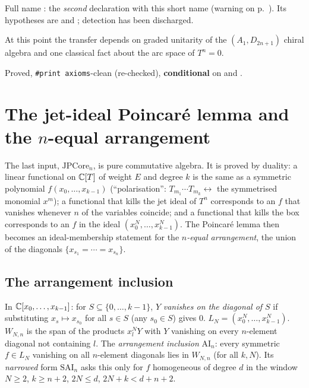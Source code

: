 \begin{dictionary}
Full name : the \emph{second} declaration with this short
name (warning on p.~\pageref{l29:warn:clash}). Its hypotheses are  and ; detection has been discharged.
\end{dictionary}

\begin{physics}
At this point the transfer depends on graded unitarity of the $(A_1,D_{2n+1})$ chiral algebra and one classical fact
about the arc space of $T^n=0$.
\end{physics}

\begin{status}
Proved, \texttt{\#print axioms}-clean (re-checked), \textbf{conditional} on  and .
\end{status}

\section{The jet-ideal Poincar\'e lemma and the \texorpdfstring{$n$}{n}-equal arrangement}\label{l29:sec:arr}

The last input, $\mathrm{JPCore}_n$, is pure commutative algebra. It is proved by duality: a linear functional on
${\mathbb{C}}[T]$ of weight $E$ and degree $k$ is the same as a symmetric polynomial $f(x_0,\dots,x_{k-1})$ (``polarisation'':
$T_{m_1}\cdots T_{m_k}\leftrightarrow$ the symmetrised monomial $x^{m}$); a functional that kills the jet ideal of
$T^n$ corresponds to an $f$ that vanishes whenever $n$ of the variables coincide; and a functional that kills the box
corresponds to an $f$ in the ideal $(x_0^N,\dots,x_{k-1}^N)$. The Poincar\'e lemma then becomes an ideal-membership
statement for the \emph{$n$-equal arrangement}, the union of the diagonals $\{x_{s_1}=\cdots=x_{s_n}\}$.

\subsection{The arrangement inclusion}

\begin{definition}\label{l29:def:arrangement}
In ${\mathbb{C}}[x_0,\dots,x_{k-1}]$: for $S\subseteq\{0,\dots,k-1\}$, $Y$ \emph{vanishes on the diagonal of $S$} if substituting
$x_s\mapsto x_{s_0}$ for all $s\in S$ (any $s_0\in S$) gives $0$. $L_N=(x_0^N,\dots,x_{k-1}^N)$. $W_{N,n}$ is the span of
the products $x_l^NY$ with $Y$ vanishing on every $n$-element diagonal not containing $l$. The \emph{arrangement
inclusion} $\mathrm{AI}_n$: every symmetric $f\in L_N$ vanishing on all $n$-element diagonals lies in $W_{N,n}$ (for all
$k,N$). Its \emph{narrowed} form $\mathrm{SAI}_n$ asks this only for $f$ homogeneous of degree $d$ in the window
$N\ge2$, $k\ge n+2$, $2N\le d$, $2N+k<d+n+2$.
\end{definition}

